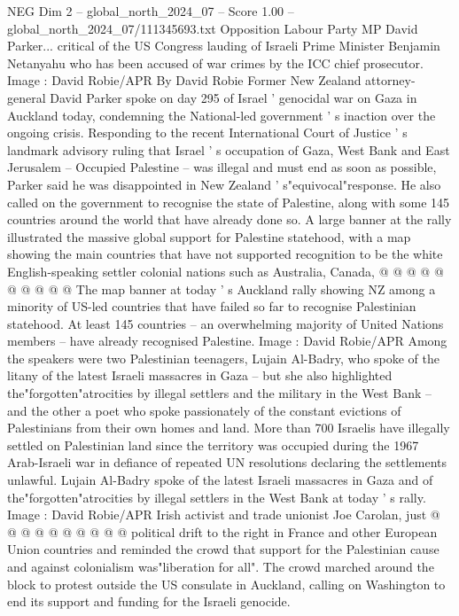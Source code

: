 \begin{textsample}{NEG Dim 2 – global\_north\_2024\_07 – Score 1.00 – global\_north\_2024\_07/111345693.txt}  \label{ex:f2_neg_259}
Opposition Labour Party MP David Parker... critical of the US Congress lauding of Israeli Prime Minister Benjamin Netanyahu who has been accused of war crimes by the ICC chief prosecutor.
Image : David Robie/APR By David Robie Former New Zealand attorney-general David Parker spoke on day 295 of Israel ' genocidal war on Gaza in Auckland today, condemning the National-led government ' s inaction over the ongoing crisis.
Responding to the recent International Court of Justice ' s landmark advisory ruling that Israel ' s occupation of Gaza, West Bank and East Jerusalem -- Occupied Palestine -- was illegal and must end as soon as possible, Parker said he was disappointed in New Zealand ' s"equivocal"response.
He also called on the government to recognise the state of Palestine, along with some 145 countries around the world that have already done so.
A large banner at the rally illustrated the massive global support for Palestine statehood, with a map showing the main countries that have not supported recognition to be the white English-speaking settler colonial nations such as Australia, Canada, @ @ @ @ @ @ @ @ @ @ The map banner at today ' s Auckland rally showing NZ among a minority of US-led countries that have failed so far to recognise Palestinian statehood.
At least 145 countries -- an overwhelming majority of United Nations members -- have already recognised Palestine.
Image : David Robie/APR Among the speakers were two Palestinian teenagers, Lujain Al-Badry, who spoke of the litany of the latest Israeli massacres in Gaza -- but she also highlighted the"forgotten"atrocities by illegal settlers and the military in the West Bank -- and the other a poet who spoke passionately of the constant evictions of Palestinians from their own homes and land.
More than 700 Israelis have illegally settled on Palestinian land since the territory was occupied during the 1967 Arab-Israeli war in defiance of repeated UN resolutions declaring the settlements unlawful.
Lujain Al-Badry spoke of the latest Israeli massacres in Gaza and of the"forgotten"atrocities by illegal settlers in the West Bank at today ' s rally.
Image : David Robie/APR Irish activist and trade unionist Joe Carolan, just @ @ @ @ @ @ @ @ @ @ political drift to the right in France and other European Union countries and reminded the crowd that support for the Palestinian cause and against colonialism was"liberation for all".
The crowd marched around the block to protest outside the US consulate in Auckland, calling on Washington to end its support and funding for the Israeli genocide.

\end{textsample}
